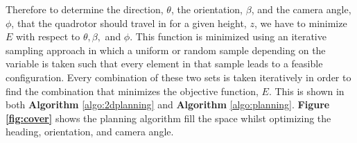 \documentclass[12pt]{article}
\newcommand{\fig}[1]{\textbf{Figure \ref{fig:#1}}}
\begin{document}

%


Therefore to determine the direction, $\theta$, the orientation, $\beta$, and
the camera angle, $\phi$, that the quadrotor should travel in for a given
height, $z$, we have to minimize $E$ with respect to $\theta, \beta,$ and
$\phi$. This function is minimized using an iterative sampling approach in
which a uniform or random sample depending on the variable is taken such that
every element in that sample leads to a feasible configuration. Every
combination of these two sets is taken iteratively in order to find the
combination that minimizes the objective function, $E$. This is shown in both
\textbf{Algorithm} \ref{algo:2dplanning} and \textbf{Algorithm}
\ref{algo:planning}. \fig{cover} shows the planning algorithm fill the space
whilst optimizing the heading, orientation, and camera angle.
\end{document}
